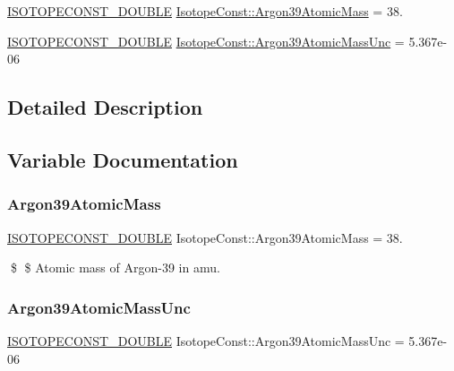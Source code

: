 \begin{DoxyCompactItemize}
\item 
\mbox{\hyperlink{group___isotope_const-_macros_ga8f45a7272ce02c0b4c65c44636ed719a}{I\+S\+O\+T\+O\+P\+E\+C\+O\+N\+S\+T\+\_\+\+D\+O\+U\+B\+LE}} \mbox{\hyperlink{group___isotope_const-_argon-_ar39_gaf2bfd94481db615cc2e0f5ad38000064}{Isotope\+Const\+::\+Argon39\+Atomic\+Mass}} = 38.
\item 
\mbox{\hyperlink{group___isotope_const-_macros_ga8f45a7272ce02c0b4c65c44636ed719a}{I\+S\+O\+T\+O\+P\+E\+C\+O\+N\+S\+T\+\_\+\+D\+O\+U\+B\+LE}} \mbox{\hyperlink{group___isotope_const-_argon-_ar39_gaa24cde625d4893e0d7cc2e8d7b3d0c03}{Isotope\+Const\+::\+Argon39\+Atomic\+Mass\+Unc}} = 5.\+367e-\/06
\end{DoxyCompactItemize}


\subsection{Detailed Description}


\subsection{Variable Documentation}
\mbox{\label{group___isotope_const-_argon-_ar39_gaf2bfd94481db615cc2e0f5ad38000064}} 
\subsubsection{\texorpdfstring{Argon39\+Atomic\+Mass}{Argon39AtomicMass}}
{\footnotesize\ttfamily \mbox{\hyperlink{group___isotope_const-_macros_ga8f45a7272ce02c0b4c65c44636ed719a}{I\+S\+O\+T\+O\+P\+E\+C\+O\+N\+S\+T\+\_\+\+D\+O\+U\+B\+LE}} Isotope\+Const\+::\+Argon39\+Atomic\+Mass = 38.}

\$ \$ Atomic mass of Argon-\/39 in amu. \mbox{\label{group___isotope_const-_argon-_ar39_gaa24cde625d4893e0d7cc2e8d7b3d0c03}} 
\subsubsection{\texorpdfstring{Argon39\+Atomic\+Mass\+Unc}{Argon39AtomicMassUnc}}
{\footnotesize\ttfamily \mbox{\hyperlink{group___isotope_const-_macros_ga8f45a7272ce02c0b4c65c44636ed719a}{I\+S\+O\+T\+O\+P\+E\+C\+O\+N\+S\+T\+\_\+\+D\+O\+U\+B\+LE}} Isotope\+Const\+::\+Argon39\+Atomic\+Mass\+Unc = 5.\+367e-\/06}

